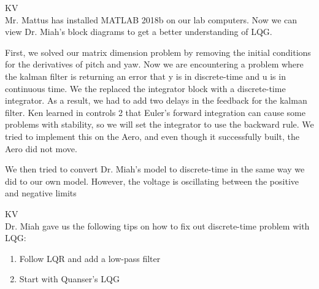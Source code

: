 \documentclass[fontsize=11pt, %
                             paper=letter, %
                             openany, %
                             captions=tableheading,
                             index=totoc,
                             hyperref]{labbook}
\begin{document}
\begin{addmargin}[0cm]{0cm}
KV\\
Mr. Mattus has installed MATLAB 2018b on our lab computers.  Now we can view Dr. Miah's block diagrams to get a better understanding of LQG.\;

First, we solved our matrix dimension problem by removing the initial conditions for the derivatives of pitch and yaw.  Now we are encountering a problem where the kalman filter is returning an error that y is in discrete-time and u is in continuous time.  We the replaced the integrator block with a discrete-time integrator.  As a result, we had to add two delays in the feedback for the kalman filter.  Ken learned in controls 2 that Euler's forward integration can cause some problems with stability, so we will set the integrator to use the backward rule.  We tried to implement this on the Aero, and even though it successfully built, the Aero did not move.\;

We then tried to convert Dr. Miah's model to discrete-time in the same way we did to our own model.  However, the voltage is oscillating between the positive and negative limits

KV\\
Dr. Miah gave us the following tips on how to fix out discrete-time problem with LQG:
\begin{enumerate}
    \item Follow LQR and add a low-pass filter
    \item Start with Quanser's LQG
\end{enumerate}


\end{addmargin}
\end{document}
